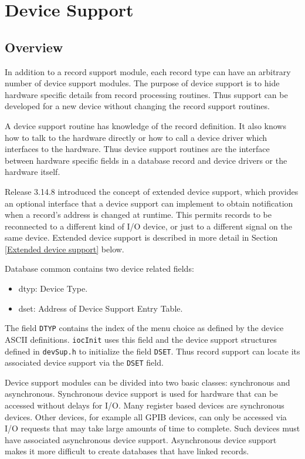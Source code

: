 \chapter{Device Support}

\section{Overview}

In addition to a record support module, each record type can have an arbitrary number of device support modules. The 
purpose of device support is to hide hardware specific details from record processing routines. Thus support can be 
developed for a new device without changing the record support routines.

A device support routine has knowledge of the record definition. It also knows how to talk to the hardware directly or how 
to call a device driver which interfaces to the hardware. Thus device support routines are the interface between hardware 
specific fields in a database record and device drivers or the hardware itself.

Release 3.14.8 introduced the concept of extended device support, which provides an optional interface that a device 
support can implement to obtain notification when a record's address is changed at runtime. This permits records to be 
reconnected to a different kind of I/O device, or just to a different signal on the same device. Extended device support is 
described in more detail in Section \ref{Extended device support} below.

Database common contains two device related fields:

\begin{itemize}
\item {}dtyp:  Device Type.

\item {}dset:  Address of Device Support Entry Table.

\end{itemize}

The field \verb|DTYP| contains the index of the menu choice as defined by the device ASCII definitions. \verb|iocInit| uses this 
field and the device support structures defined in \verb|devSup.h| to initialize the field \verb|DSET|. Thus record support can locate 
its associated device support via the \verb|DSET| field.

Device support modules can be divided into two basic classes: synchronous and asynchronous. Synchronous device 
support is used for hardware that can be accessed without delays for I/O. Many register based devices are synchronous 
devices. Other devices, for example all GPIB devices, can only be accessed via I/O requests that may take large amounts 
of time to complete. Such devices must have associated asynchronous device support. Asynchronous device support 
makes it more difficult to create databases that have linked records.

